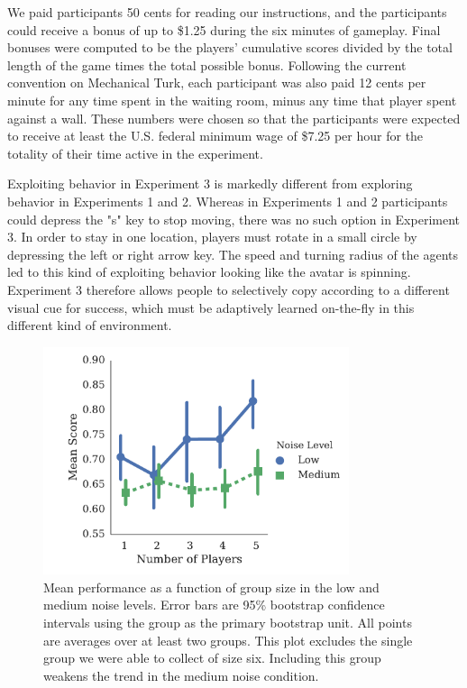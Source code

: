 \documentclass[12pt,letterpaper]{article}
\begin{document}
We paid participants 50 cents for reading our
instructions, and the participants could receive a bonus of up to
\$1.25 during the six minutes of gameplay. Final bonuses were computed
to be the players' cumulative scores divided by the total length of
the game times the total possible bonus.  Following the current
convention on Mechanical Turk, each participant was also paid 12 cents
per minute for any time spent in the waiting room, minus any time that
player spent against a wall.  These numbers were chosen so that the
participants were expected to receive at least the U.S. federal minimum
wage of \$7.25 per hour for the totality of their time active in the
experiment.

Exploiting behavior in Experiment 3 is markedly different from exploring behavior in Experiments 1 and 2. Whereas in Experiments 1 and 2 participants could depress the "s" key to stop moving, there was no such option in Experiment 3.  In order to stay in one location, players must rotate in a small circle by depressing the left or right arrow key. The speed and turning radius of the agents led to this kind of exploiting behavior looking like the avatar is spinning. Experiment 3 therefore allows people to selectively copy according to a different visual cue for success, which must be adaptively learned on-the-fly in this different kind of environment.


\begin{figure}[t]
  \centering
  \includegraphics[width=0.8\textwidth]{./figures/performance-summary}
  \caption{Mean performance as a function of group size in the low and
    medium noise levels.  Error bars are 95\% bootstrap confidence
    intervals using the group as the primary bootstrap unit.  All
    points are averages over at least two groups.  This plot excludes
    the single group we were able to collect of size six.  Including
    this group weakens the trend in the medium noise condition.}
  \label{fig:performance}
\end{figure}
\end{document}
